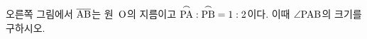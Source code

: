 \noindent\begin{minipage}[t]{0.58\linewidth}\vspace{0pt}\raggedright 오른쪽 그림에서 $\overline{\mathrm{AB}}$는 원~$\mathrm{O}$의 지름이고 $\overset{\frown}{\mathrm{PA}}:\overset{\frown}{\mathrm{PB}}=1:2$이다. 이때 $\angle\mathrm{PAB}$의 크기를 구하시오.\end{minipage}\hfill\begin{minipage}[t]{0.4\linewidth}\vspace{0pt}\centering \resizebox{\ifdim\width>\linewidth\linewidth\else\width\fi}{!}{}\end{minipage}\par
